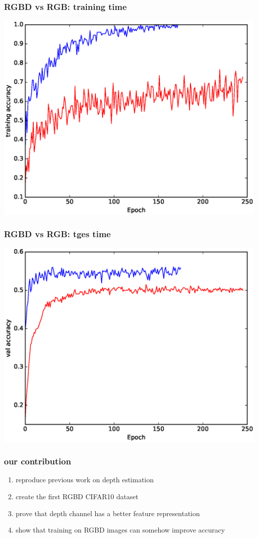 \documentclass{beamer}
\begin{document}
\begin{frame}
\frametitle{RGBD vs RGB: training time}
\includegraphics[width=\linewidth]{together_train.eps}
\end{frame}


\begin{frame}
\frametitle{RGBD vs RGB: tges time}
\includegraphics[width=\linewidth]{together_test.eps}
\end{frame}



\begin{frame}
\frametitle{our contribution}
\begin{enumerate}
\item reproduce previous work on depth estimation
\item create the first RGBD CIFAR10 dataset
\item prove that depth channel has a better feature representation 
\item show that training on RGBD images can somehow improve accuracy
\end{enumerate}
\end{frame}
\end{document}
